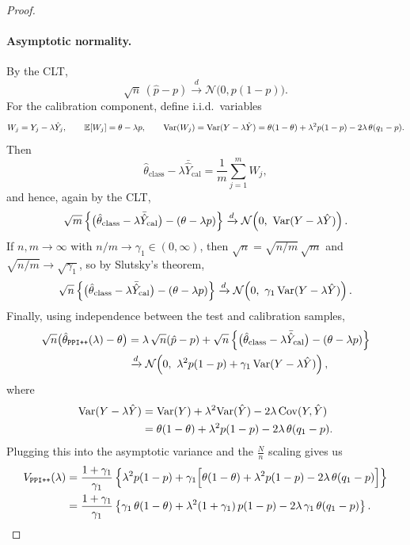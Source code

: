 \begin{proof}
\paragraph{Asymptotic normality.}
By the CLT,
\[
\sqrt{n}\,(\hat p-p)\xrightarrow{d}\mathcal N\bigl(0,p(1-p)\bigr).
\]
For the calibration component, define i.i.d.\ variables
\[
W_j=Y_j-\lambda \hat Y_j,
\qquad
\mathbb{E}[W_j]=\theta-\lambda p,
\qquad
\mathrm{Var}(W_j)=\mathrm{Var}(Y-\lambda\hat Y)=\theta(1-\theta)+\lambda^2 p(1-p)-2\lambda\,\theta(q_1-p).
\]
Then
\[
\hat\theta_{\mathrm{class}}-\lambda\bar{\hat Y}_{\mathrm{cal}}
=\frac{1}{m}\sum_{j=1}^m W_j,
\]
and hence, again by the CLT,
\[
\sqrt{m}\left\{\bigl(\hat\theta_{\mathrm{class}}-\lambda\bar{\hat Y}_{\mathrm{cal}}\bigr)-(\theta-\lambda p)\right\}
\xrightarrow{d}
\mathcal N\!\left(0,\ \mathrm{Var}(Y-\lambda\hat Y)\right).
\]
If $n,m\to\infty$ with $n/m\to\gamma_1\in(0,\infty)$, then
$\sqrt{n}=\sqrt{n/m}\,\sqrt{m}$ and $\sqrt{n/m}\to\sqrt{\gamma_1}$, so by Slutsky's theorem,
\[
\sqrt{n}\left\{\bigl(\hat\theta_{\mathrm{class}}-\lambda\bar{\hat Y}_{\mathrm{cal}}\bigr)-(\theta-\lambda p)\right\}
\xrightarrow{d}
\mathcal N\!\left(0,\ \gamma_1\,\mathrm{Var}(Y-\lambda\hat Y)\right).
\]
Finally, using independence between the test and calibration samples,
\begin{align*}
\sqrt{n}\bigl(\hat\theta_{\mathrm{\texttt{PPI++}}}(\lambda)-\theta\bigr)
&=
\lambda\,\sqrt{n}(\hat p-p)
+
\sqrt{n}\left\{\bigl(\hat\theta_{\mathrm{class}}-\lambda\bar{\hat Y}_{\mathrm{cal}}\bigr)-(\theta-\lambda p)\right\}\\
&\xrightarrow{d}
\mathcal N\!\left(0,\ \lambda^2 p(1-p)+\gamma_1\,\mathrm{Var}(Y-\lambda\hat Y)\right),
\end{align*}
where
\begin{align*}
\mathrm{Var}(Y-\lambda\hat Y)
&=\mathrm{Var}(Y)+\lambda^2\mathrm{Var}(\hat Y)-2\lambda\,\mathrm{Cov}(Y,\hat Y)\\
&=\theta(1-\theta)+\lambda^2 p(1-p)-2\lambda\,\theta(q_1-p).
\end{align*}
Plugging this into the asymptotic variance and the $\frac{N}{n}$ scaling gives us
\begin{align*}
V_{\mathrm{\texttt{PPI++}}}(\lambda)
&=\frac{1+\gamma_1}{\gamma_1}\left\{\lambda^2 p(1-p)+\gamma_1\Bigl[\theta(1-\theta)+\lambda^2 p(1-p)-2\lambda\,\theta(q_1-p)\Bigr]\right\}\\
&=\frac{1+\gamma_1}{\gamma_1}\left\{\gamma_1\,\theta(1-\theta)+\lambda^2(1+\gamma_1)\,p(1-p)-2\lambda\,\gamma_1\,\theta(q_1-p)\right\}.
\end{align*}
\end{proof}

